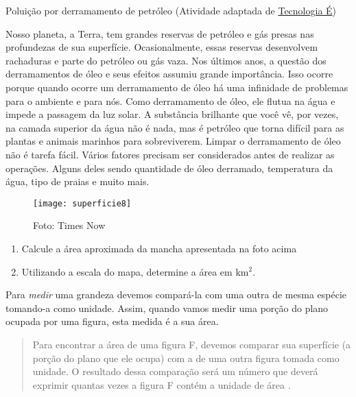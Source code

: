 \begin{task}{Poluição por derramamento de petróleo}
(Atividade adaptada de \href{https://www.tecnologiae.com.br/poluicao-derramamento-petroleo-quais-consequencias/}{Tecnologia É})

Nosso planeta, a Terra, tem grandes reservas de petróleo e gás presas nas profundezas de sua superfície. Ocasionalmente, essas reservas desenvolvem rachaduras e parte do petróleo ou gás vaza. Nos últimos anos, a questão dos derramamentos de óleo e seus efeitos assumiu grande importância. Isso ocorre porque quando ocorre um derramamento de óleo há uma infinidade de problemas para o ambiente e para nós. Como derramamento de óleo, ele flutua na água e impede a passagem da luz solar. A substância brilhante que você vê, por vezes, na camada superior da água não é nada, mas é petróleo que torna difícil para as plantas e animais marinhos para sobreviverem. Limpar o derramamento de óleo não é tarefa fácil. Vários fatores precisam ser considerados antes de realizar as operações. Alguns deles sendo quantidade de óleo derramado, temperatura da água, tipo de praias e muito mais.

\begin{figure}[H]
\centering

\texttt{[image: superficie8]}


\caption{Foto: Times Now}
\end{figure}

\begin{enumerate}
  \item Calcule a área aproximada da mancha apresentada na foto acima
  \item Utilizando a escala do mapa, determine a área em km$^2$.
\end{enumerate}

\end{task}


Para \textit{medir} uma grandeza devemos compará-la com uma outra de mesma espécie tomando-a como unidade. Assim, quando vamos medir uma porção do plano ocupada por uma figura, esta medida é a sua área.

\begin{quote}
Para encontrar a área de uma figura F, devemos comparar sua superfície (a porção do plano que ele ocupa) com a de uma outra figura tomada como unidade. O resultado dessa comparação será um número que deverá exprimir quantas vezes a figura F contém a unidade de área \citep[p. 92]{lima2013}.
\end{quote}

